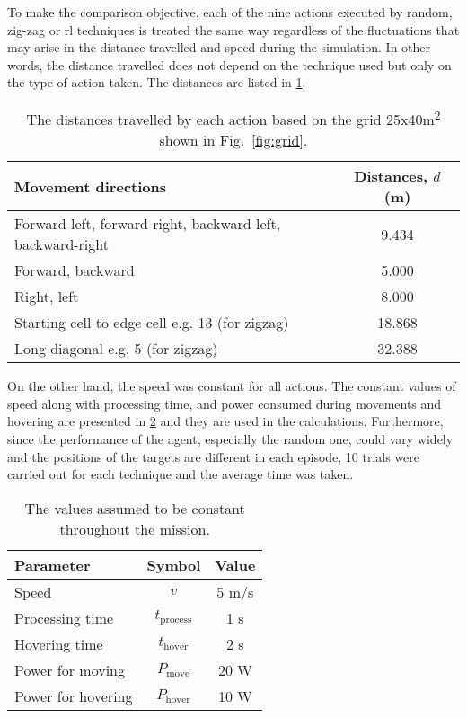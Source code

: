 \documentclass[../main.tex]{subfiles}
\begin{document}
To make the comparison objective, 
each of the nine actions executed by random, zig-zag
or \gls{rl} techniques is treated the same way regardless 
of the fluctuations that may arise in the 
distance travelled and speed during
the simulation.
In other words, the distance travelled does not depend
on the technique used but only 
on the type of action taken. 
The distances are listed in \cref{tab:distances}.

\begin{table}[tbp]
\caption{The distances travelled by each action based on
    the grid 25x40m\textsuperscript{2} shown in 
    Fig.~\ref{fig:grid}.}
\label{tab:distances}
\centering
\begin{tabular}{p{3.4in} c}
\toprule
Movement directions & Distances, $d$ (m) \\
\midrule
\raggedright Forward-left, forward-right, 
backward-left, backward-right & 9.434 \\
Forward, backward & 5.000 \\
Right, left & 8.000 \\
Starting cell to edge cell e.g. 13\textrightarrow 1 (for zigzag) & 18.868 \\
\raggedright Long diagonal e.g. 5\textrightarrow 6 (for zigzag) & 32.388 \\
\bottomrule
\end{tabular}
\end{table}

On the other hand, the speed was constant for all actions. 
The constant values of speed along with processing time,
and power consumed during movements and hovering
are presented
in \cref{tab:assumptions}
and they are used in the calculations.
Furthermore, since the performance of the agent,
especially the random one, could vary widely and
the positions of the targets are different in each episode, 
10 trials were carried out for each technique and
the average time was taken.

\begin{table}[tbp]
\caption{The values assumed to be constant throughout the
mission.}
\label{tab:assumptions}
\centering
\begin{tabular}{l c c}
\toprule
Parameter & Symbol & Value \\
\midrule
Speed & $v$ & 5 m/s \\
Processing time & $t_{\text{process}}$ & 1 s \\
Hovering time & $t_{\text{hover}}$ & 2 s \\
Power for moving & $P_{\text{move}}$ & 20 W \\
Power for hovering & $P_{\text{hover}}$ & 10 W \\
\bottomrule
\end{tabular}
\end{table}
\end{document}

